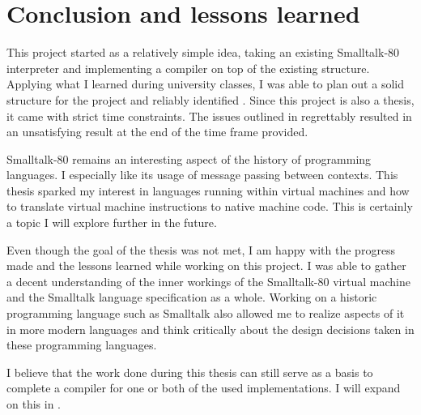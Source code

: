 \chapter{Conclusion and lessons learned}\label{cha:conclusion}

This project started as a relatively simple idea, taking an existing Smalltalk-80 interpreter and implementing a \jit{} compiler on top of the existing structure. 
Applying what I learned during university classes, I was able to plan out a solid structure for the project and reliably identified \bbs{}.
Since this project is also a thesis, it came with strict time constraints. The issues outlined in  regrettably resulted in an unsatisfying result at the end of the time frame provided.

Smalltalk-80 remains an interesting aspect of the history of programming languages. I especially like its usage of message passing between contexts. This thesis sparked my interest in languages running within virtual machines and how to translate virtual machine instructions to native machine code. This is certainly a topic I will explore further in the future.

Even though the goal of the thesis was not met, I am happy with the progress made and the lessons learned while working on this project. 
I was able to gather a decent understanding of the inner workings of the Smalltalk-80 virtual machine and the Smalltalk language specification as a whole. Working on a historic programming language such as Smalltalk also allowed me to realize aspects of it in more modern languages and think critically about the design decisions taken in these programming languages.

I believe that the work done during this thesis can still serve as a basis to complete a \jit{} compiler for one or both of the used implementations. I will expand on this in .
